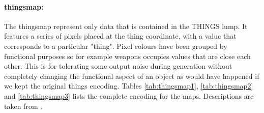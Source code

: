 \paragraph{\gls{thingsmap}:} The \gls{thingsmap} represent only data that is contained in the THINGS lump. It features a series of pixels placed at the thing coordinate, with a value that corresponds to a particular "thing". Pixel colours have been grouped by functional purposes so for example weapons occupies values that are close each other. This is for tolerating some output noise during generation without completely changing the functional aspect of an object as would have happened if we kept the original things encoding. Tables \ref{tab:thingsmap1}, \ref{tab:thingsmap2} and \ref{tab:thingsmap3} lists the complete encoding for the maps. Descriptions are taken from \cite{wiki:thingtypes}.

